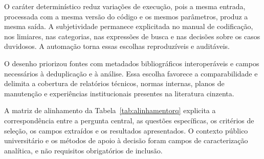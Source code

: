 O caráter determinístico reduz variações de execução, pois a mesma entrada, processada com a mesma versão do código e os mesmos parâmetros, produz a mesma saída. A subjetividade permanece explicitada no manual de codificação, nos limiares, nas categorias, nas expressões de busca e nas decisões sobre os casos duvidosos. A automação torna essas escolhas reproduzíveis e auditáveis.

O desenho priorizou fontes com metadados bibliográficos interoperáveis e campos necessários à deduplicação e à análise. Essa escolha favorece a comparabilidade e delimita a cobertura de relatórios técnicos, normas internas, planos de manutenção e experiências institucionais presentes na literatura cinzenta.

A matriz de alinhamento da Tabela~\ref{tab:alinhamentorq} explicita a correspondência entre a pergunta central, as questões específicas, os critérios de seleção, os campos extraídos e os resultados apresentados. O contexto público universitário e os métodos de apoio à decisão foram campos de caracterização analítica, e não requisitos obrigatórios de inclusão.

